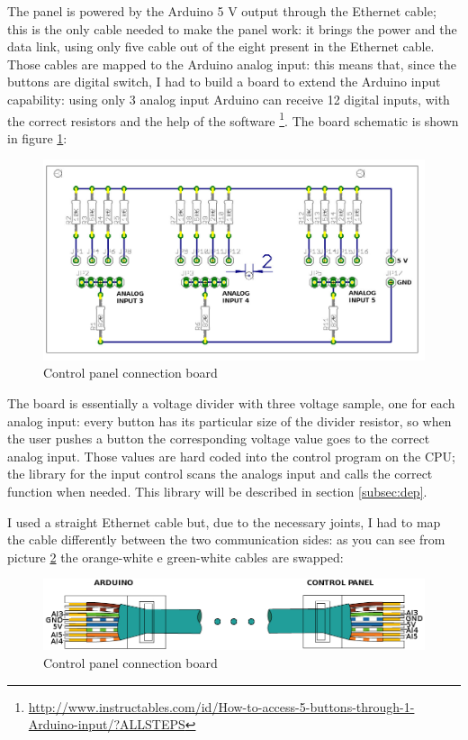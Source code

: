 \documentclass[11pt,english]{article}
\begin{document}
The panel is powered by the Arduino 5 V output through the Ethernet cable; this is the only cable needed to make 
the panel work: it brings the power and the data link, using only five cable out of the eight present in the 
Ethernet cable.
Those cables are mapped to the Arduino analog input: this means that, since the buttons are digital switch, I 
had to build a board to extend the Arduino input capability: using only 3 analog input Arduino can receive 
12 digital inputs, with the correct resistors and the help of the software 
\footnote{\url{http://www.instructables.com/id/How-to-access-5-buttons-through-1-Arduino-input/?ALLSTEPS}}. 
The board schematic is shown in figure \ref{fig:panel-board}:

%
\begin{figure}[htb]
\centering\includegraphics[scale=0.25]{img/Panel-board}

\caption{Control panel connection board \label{fig:panel-board}}

\end{figure}

The board is essentially a voltage divider with three voltage sample, one for each analog input: every button 
has its particular size of the divider resistor, so when the user pushes a button the corresponding voltage 
value goes to the correct analog input. Those values are hard coded into the control program on the CPU; 
the library for the input control scans the analogs input and calls the correct function when needed. This
library will be described in section \ref{subsec:dep}.

I used a straight Ethernet cable but, due to the necessary joints, I had to map the cable differently between the 
two communication sides: as you can see from picture \ref{fig:panel-cable} the orange-white e green-white 
cables are swapped:

%
\begin{figure}[htb]
\centering\includegraphics[scale=0.40]{img/Panel-cable}

\caption{Control panel connection board \label{fig:panel-cable}}

\end{figure}
\end{document}
